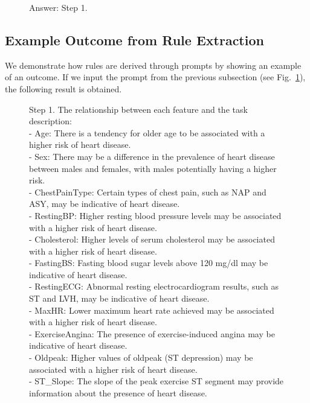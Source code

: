 \documentclass{article}
\theoremstyle{plain}
\theoremstyle{definition}
\theoremstyle{remark}
\begin{document}
\begin{figure}[ht!]
\begin{tcolorbox}[enhanced,attach boxed title to top center={yshift=-3mm,yshifttext=-1mm},
  colback=black!0!white, colframe=black!20!white, colbacktitle=black!10!white, coltitle=blue!20!black ]
{Answer: Step 1. 
}
\end{tcolorbox}
\label{fig:appendix-prompt_for_rule}            
\end{figure}


\newpage


\subsection{Example Outcome from Rule Extraction}
\label{sec:outcome-rule}
We demonstrate how rules are derived through prompts by showing an example of an outcome. If we input the prompt from the previous subsection (see Fig.~\ref{fig:appendix-prompt_for_rule}), the following result is obtained.


\begin{figure}[ht!]
\begin{tcolorbox}[enhanced,attach boxed title to top center={yshift=-3mm,yshifttext=-1mm},
  colback=black!0!white, colframe=black!20!white, colbacktitle=black!10!white, coltitle=blue!20!black ]
\footnotesize{
Step 1. The relationship between each feature and the task description: \\

- Age: There is a tendency for older age to be associated with a higher risk of heart disease. \\
- Sex: There may be a difference in the prevalence of heart disease between males and females, with males potentially having a higher risk. \\
- ChestPainType: Certain types of chest pain, such as NAP and ASY, may be indicative of heart disease. \\
- RestingBP: Higher resting blood pressure levels may be associated with a higher risk of heart disease. \\
- Cholesterol: Higher levels of serum cholesterol may be associated with a higher risk of heart disease. \\
- FastingBS: Fasting blood sugar levels above 120 mg/dl may be indicative of heart disease. \\
- RestingECG: Abnormal resting electrocardiogram results, such as ST and LVH, may be indicative of heart disease. \\
- MaxHR: Lower maximum heart rate achieved may be associated with a higher risk of heart disease. \\
- ExerciseAngina: The presence of exercise-induced angina may be indicative of heart disease. \\
- Oldpeak: Higher values of oldpeak (ST depression) may be associated with a higher risk of heart disease. \\
- ST\_Slope: The slope of the peak exercise ST segment may provide information about the presence of heart disease.  \\~\\


}
\end{tcolorbox}
\end{figure}
\end{document}
